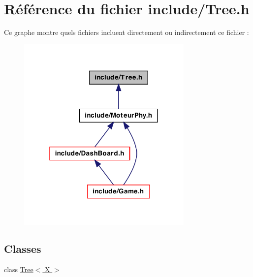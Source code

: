 \hypertarget{a00035}{
\section{Référence du fichier include/Tree.h}
\label{a00035}
}
Ce graphe montre quels fichiers incluent directement ou indirectement ce fichier :
\nopagebreak
\begin{figure}[H]
\begin{center}
\leavevmode
\includegraphics[width=244pt]{a00068}
\end{center}
\end{figure}
\subsection*{Classes}
\begin{DoxyCompactItemize}
\item 
class \hyperlink{a00015}{Tree$<$ X $>$}
\end{DoxyCompactItemize}
